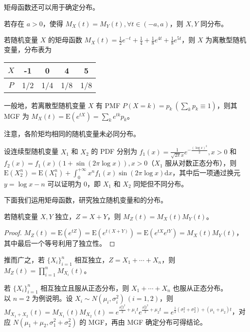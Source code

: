 \documentclass[../main.tex]{subfiles}
\begin{document}
矩母函数还可以用于确定分布。

\begin{theorem}\label{thm:4.6.2}
    若存在 $a>0$，使得 $M_X(t)=M_Y(t),\forall t\in(-a,a)$，则 $X,Y$ 同分布。
\end{theorem}

\begin{example}
    若随机变量 $X$ 的矩母函数 $M_X(t)=\frac12e^{-t}+\frac14+\frac18e^{4t}+\frac18e^{5t}$，则 $X$ 为离散型随机变量，分布表为

    \bigskip
    \begin{tabular}{|c|c|c|c|c|}
        \hline
        $X$ & -1  & 0   & 4   & 5   \\
        \hline
        $P$ & 1/2 & 1/4 & 1/8 & 1/8 \\
        \hline
    \end{tabular}
    \bigskip

    一般地，若离散型随机变量 $X$ 有 PMF $P(X=k)=p_k\ (\sum_k p_k\equiv1)$，则其 MGF 为 $M_X(t)=\mathrm E(e^{tX})=\sum_ke^{tk}p_k$。
\end{example}

注意，各阶矩均相同的随机变量未必同分布。

\begin{example}
    设连续型随机变量 $X_1$ 和 $X_2$ 的 PDF 分别为 $f_1(x)=\frac{1}{\sqrt{2\pi}x}e^{-\frac{(\log x)^2}{2}},x>0$ 和 $f_2(x)=f_1(x)(1+\sin(2\pi\log x)),x>0$（$X_1$ 服从对数正态分布），则 $\mathrm E(X_2^n)=\mathrm E(X_1^n)+\int_0^{+\infty}x^nf_1(x)\sin(2\pi\log x)\mathrm dx$，其中后一项通过换元 $y=\log x-n$ 可以证明为 $0$，即 $X_1$ 和 $X_2$ 同矩但不同分布。
\end{example}

下面我们运用矩母函数，研究独立随机变量和的分布。

\begin{theorem}\label{thm:4.6.3}
    若随机变量 $X,Y$ 独立，$Z=X+Y$，则 $M_Z(t)=M_X(t)M_Y(t)$。
\end{theorem}

\begin{proof}
    $M_Z(t)=\mathrm E(e^{tZ})=\mathrm E(e^{t(X+Y)})=\mathrm E(e^{tX}e^{tY})=M_X(t)M_Y(t)$，其中最后一个等号利用了独立性。
\end{proof}

推而广之，若 $\{X_i\}_{i=1}^n$ 相互独立，$Z=X_1+\cdots+X_n$，则 $M_Z(t)=\prod_{i=1}^nM_{X_i}(t)$。

\begin{example}
    若 $\{X_i\}_{i=1}^n$ 相互独立且服从正态分布，则 $X_1+\cdots+X_n$ 也服从正态分布。\\
    以 $n=2$ 为例说明。设 $X_i\sim N(\mu_i,\sigma_i^2)\ (i=1,2)$，则 $M_{X_1+X_2}(t)=M_{X_1}(t)M_{X_2}(t)=e^{\frac{\sigma_1^2t^2}2+\mu_1t}e^{\frac{\sigma_2^2t^2}2+\mu_2t}=e^{\frac12(\sigma_1^2+\sigma_2^2)+(\mu_1+\mu_2)t}$，对应 $N(\mu_1+\mu_2,\sigma_1^2+\sigma_2^2)$ 的 MGF，再由 MGF 确定分布可得结论。
\end{example}
\end{document}
